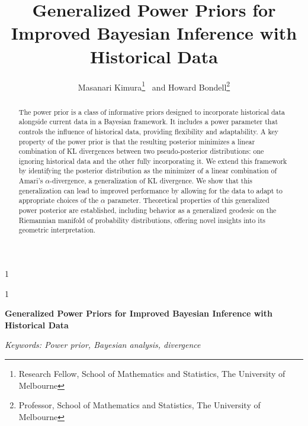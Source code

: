 \documentclass[12pt]{article}
\newcommand{\blind}{1}
\begin{document}
%

\def\spacingset#1{\renewcommand{\baselinestretch}%
{#1}\small\normalsize} \spacingset{1}



\blind
{
  \title{\bf Generalized Power Priors for Improved Bayesian Inference with Historical Data}
  \author{Masanari Kimura\thanks{Research Fellow, School of Mathematics and Statistics, The University of Melbourne} \ 
  and
  Howard Bondell\thanks{Professor, School of Mathematics and Statistics, The University of Melbourne}
    }
  \maketitle
} \fi

\blind
{
  \bigskip
  \bigskip
  \bigskip
  \begin{center}
    {\LARGE\bf Generalized Power Priors for Improved Bayesian Inference with Historical Data}
\end{center}
  \medskip
} \fi

\bigskip
\begin{abstract}
The power prior is a class of informative priors designed to incorporate historical data alongside current data in a Bayesian framework.
It includes a power parameter that controls the influence of historical data, providing flexibility and adaptability.
A key property of the power prior is that the resulting posterior minimizes a linear combination of KL divergences between two pseudo-posterior distributions: one ignoring historical data and the other fully incorporating it.
We extend this framework by identifying the posterior distribution as the minimizer of a linear combination of Amari’s $\alpha$-divergence, a generalization of KL divergence.
We show that this generalization can lead to improved performance by allowing for the data to adapt to appropriate choices of the $\alpha$ parameter. Theoretical properties of this generalized power posterior are established, including behavior as a generalized geodesic on the Riemannian manifold of probability distributions, offering novel insights into its geometric interpretation.
\end{abstract}

\noindent%
{\it Keywords: Power prior, Bayesian analysis, divergence} 
\vfill

\newpage
\spacingset{1.45} %
\end{document}
